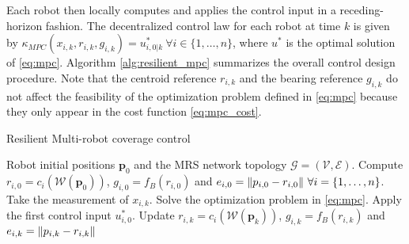 Each robot then locally computes and applies the control input in a receding-horizon fashion. The decentralized control law for each robot at time $k$ is given by $ \kappa_{MPC}(x_{i,k}, r_{i,k}, g_{i,k}) = u_{i,0|k}^{*} \ \forall i \in \{1,\dots, n\}$, where $u^{*}$ is the optimal solution of \eqref{eq:mpc}. Algorithm \ref{alg:resilient_mpc} summarizes the overall control design procedure. Note that the centroid reference $r_{i,k}$ and the bearing reference $g_{i,k}$ do not affect the feasibility of the optimization problem defined in \eqref{eq:mpc} because they only appear in the cost function \eqref{eq:mpc_cost}.
\begin{algorithm}[t]
\caption{Resilient Multi-robot coverage control}\label{alg:resilient_mpc}
\begin{algorithmic}[1]
\Require Robot initial positions $\mathbf{p}_{0}$ and the MRS network topology $\mathcal{G} = (\mathcal{V}, \mathcal{E})$.
\State Compute $r_{i,0} = c_i(\mathcal{W}(\mathbf{p}_0))$, $g_{i,0} = f_B(r_{i,0})$ and $e_{i,0} = \norm{p_{i,0} - r_{i,0}} \ \forall i = \{ 1, \dots, n\}$.
        \State Take the measurement of $x_{i,k}$.
        \State Solve the optimization problem in \eqref{eq:mpc}.
        \State Apply the first control input $u_{i,0}^{*}$.
            \State Update $r_{i,k} = c_i(\mathcal{W}(\mathbf{p}_k))$, $g_{i,k} = f_B(r_{i,k})$ and $e_{i,k} = \lVert p_{i,k} - r_{i,k}\rVert$
        \EndIf 
    \EndFor
\EndFor
\end{algorithmic}
\end{algorithm}

